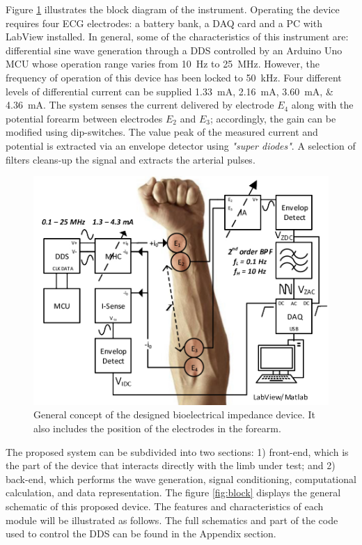 Figure \ref{fig:electrode} illustrates the block diagram of the instrument. Operating the device requires four ECG electrodes: a battery bank, a DAQ card and a PC with LabView \cite{LabView:2016} installed. In general, some of the characteristics of this instrument are: differential sine wave generation through a DDS controlled by an Arduino Uno MCU \cite{arduino} whose operation range varies from \SI{10}{\Hz} to \SI{25}{\MHz}. However, the frequency of operation of this device has been locked to \SI{50}{\kHz}. Four different levels of differential current can be supplied \SIlist{1.33;2.16;3.60;4.36}{\mA}. The system senses the current delivered by electrode $E_4$ along with the potential forearm between electrodes $E_2$ and $E_3$; accordingly, the gain can be modified using dip-switches. The value peak of the measured current and potential is extracted via an envelope detector using \textit{"super diodes"}. A selection of filters cleans-up the signal and extracts the arterial pulses.

\begin{figure}[!htpb]
	\centering
	\includegraphics[width=12cm,keepaspectratio]{figure1}	
	\caption[General concept of the designed bioelectrical impedance device]{General concept of the designed bioelectrical impedance device. It also includes the position of the electrodes in the forearm.}
	\label{fig:electrode}
\end{figure}

The proposed system can be subdivided into two sections: 1) front-end, which is the part of the device that interacts directly with the limb under test; and 2) back-end, which performs the wave generation, signal conditioning, computational calculation, and data representation. The figure \ref{fig:block} displays the general schematic of this proposed device. The features and characteristics of each module will be illustrated as follows. The full schematics and part of the code used to control the DDS can be found in the Appendix section.


